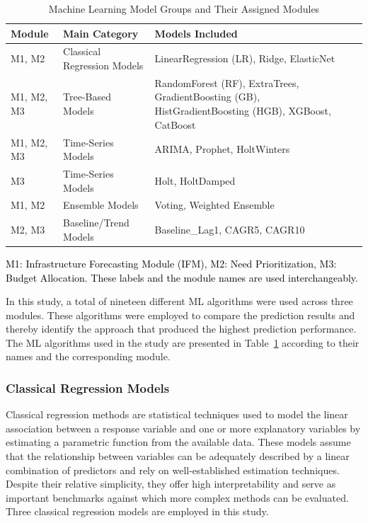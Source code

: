 \documentclass[final, 9pt, twocolumn]{saucis}
\newcommand{\rev}[1]{\textcolor{black}{#1}}
\begin{document}
\begin{table}[htbp]
\centering
\caption{Machine Learning Model Groups and Their Assigned Modules}
\label{tab:models}
\small
\begin{threeparttable}
\begin{tabular}{p{1cm} p{2.5cm} p{4.2cm}}
\hline
\textbf{Module} & \textbf{Main Category} & \textbf{Models Included} \\
\hline
M1, M2       & Classical Regression Models  & LinearRegression (LR), Ridge, ElasticNet \\
M1, M2, M3   & Tree-Based Models            & RandomForest (RF), ExtraTrees, GradientBoosting (GB), HistGradientBoosting (HGB), XGBoost, CatBoost \\
M1, M2, M3   & Time-Series Models           & ARIMA, Prophet, HoltWinters \\
M3           & Time-Series Models           & Holt, HoltDamped \\
M1, M2       & Ensemble Models              & Voting, Weighted Ensemble \\
M2, M3       & Baseline/Trend Models        & Baseline\_Lag1, CAGR5, CAGR10 \\
\hline
\end{tabular}
\begin{tablenotes}
\footnotesize
\item \rev{M1: Infrastructure Forecasting Module (IFM), M2: Need Prioritization, M3: Budget Allocation. These labels and the module names are used interchangeably.}
\end{tablenotes}
\end{threeparttable}
\end{table}

In this study, a total of nineteen different ML algorithms were used across three modules. These algorithms were employed to compare the prediction results and thereby identify the approach that produced the highest prediction performance. The ML algorithms used in the study are presented in Table~\ref{tab:models}
according to their names and the corresponding module.

\subsubsection{Classical Regression Models}

Classical regression methods are statistical techniques used to model the linear association between a response variable and one or more explanatory variables by estimating a parametric function from the available data. These models assume that the relationship between variables can be adequately described by a linear combination of predictors and rely on well-established estimation techniques. Despite their relative simplicity, they offer high interpretability and serve as important benchmarks against which more complex methods can be evaluated. Three classical regression models are employed in this study.
\end{document}
